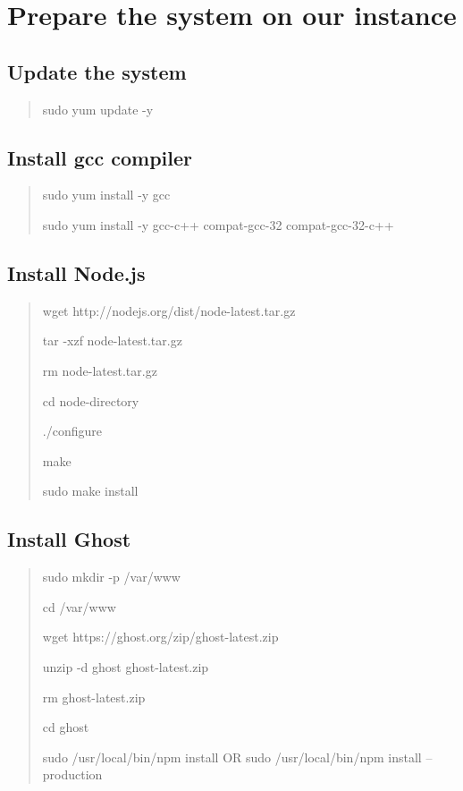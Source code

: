 \documentclass[a4paper]{report}
\begin{document}
  \section{Prepare the system on our instance}
    \subsection{Update the system}
      \begin{quotation}
        sudo yum update -y
      \end{quotation}

    \subsection{Install gcc compiler}
      \begin{quotation}
        sudo yum install -y gcc

        sudo yum install -y gcc-c++ compat-gcc-32 compat-gcc-32-c++
      \end{quotation}

    \subsection{Install Node.js}
      \begin{quotation}
        wget http://nodejs.org/dist/node-latest.tar.gz

        tar -xzf node-latest.tar.gz

        rm node-latest.tar.gz

        cd node-directory

        ./configure

        make

        sudo make install
      \end{quotation}

    \subsection{Install Ghost}
      \begin{quotation}

        sudo mkdir -p /var/www

        cd /var/www

        wget https://ghost.org/zip/ghost-latest.zip

        unzip -d ghost ghost-latest.zip

        rm ghost-latest.zip

        cd ghost

        sudo /usr/local/bin/npm install OR sudo /usr/local/bin/npm install --production
      \end{quotation}
\end{document}
